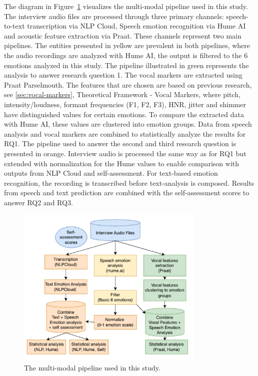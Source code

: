 The diagram in Figure~\ref{fig:pipeline} visualizes the multi-modal pipeline used in this study.  
The interview audio files are processed through three primary channels: speech-to-text transcription via NLP Cloud,  
Speech emotion recognition via Hume AI and acoustic feature extraction via Praat.  
These channels represent two main pipelines.  
The entities presented in yellow are prevalent in both pipelines, where the audio recordings are analyzed with Hume AI, the output is filtered to the 6 emotions analyzed in this study.  
The pipeline illustrated in green represents the analysis to answer research question 1.  
The vocal markers are extracted using Praat Parselmouth.  
The features that are chosen are based on previous research, see \ref{sec:vocal-markers}, Theoretical Framework - Vocal Markers, where pitch, intensity/loudness, formant frequencies (F1, F2, F3), HNR,  
jitter and shimmer have distinguished values for certain emotions.  
To compare the extracted data with Hume AI, these values are clustered into emotion groups.  
Data from speech analysis and vocal markers are combined to statistically analyze the results for RQ1.  
The pipeline used to answer the second and third research question is presented in orange. 
Interview audio is processed the same way as for RQ1 but extended with normalization for the Hume values to enable comparison with outputs from NLP Cloud and self-assessment.  
For text-based emotion recognition, the recording is transcribed before text-analysis is composed. 
Results from speech and text prediction are combined with the self-assessment scores to answer RQ2 and RQ3. 

\begin{figure}[H]
    \centering
    \includegraphics[width=0.8\textwidth]{png/flowchart2.png}
    \caption{The multi-modal pipeline used in this study.}
    \label{fig:pipeline}
\end{figure}


